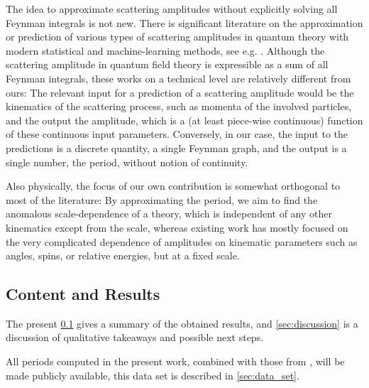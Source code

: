 \documentclass[11pt]{scrartcl}
\numberwithin{equation}{section}
\begin{document}
The idea to approximate scattering amplitudes without explicitly solving all Feynman integrals is not new.
There is significant literature on the approximation or prediction of various types of scattering amplitudes in quantum theory with modern statistical and machine-learning methods, see e.g. \cite{badger_using_2020,maitre_factorisationaware_2021,badger_loop_2023,ilten_modeling_2023,chahrour_comparing_2022,mizera_scattering_2023,maitre_oneloop_2023}.
Although the scattering amplitude in quantum field theory is expressible as a sum of all Feynman integrals, these works on a technical level are relatively different from ours:    The relevant input for a prediction of a scattering amplitude would be the kinematics of the scattering process, such as   momenta of the involved particles, and the output the amplitude, which is a (at least piece-wise continuous) function of these continuous input parameters. Conversely, in our case, the input to the predictions is a discrete quantity, a single Feynman graph, and the output is a single number, the period,  without notion of continuity.

Also physically, the focus of our own contribution is somewhat orthogonal to most of the literature: By approximating the period, we aim to find the anomalous scale-dependence of a theory, which is independent of any other kinematics except from the scale, whereas existing work has mostly focused on the very complicated dependence of amplitudes on kinematic parameters such as angles, spins, or relative energies, but at a fixed scale. 







\subsection{Content and Results}\label{sec:results}
The present \cref{sec:results} gives a summary of the obtained results, and
\cref{sec:discussion} is a discussion of qualitative takeaways and possible next steps.

All periods computed in the present work, combined with those from \cite{balduf_statistics_2023},   will be made publicly available, this data set is described in \cref{sec:data_set}.  
\end{document}
